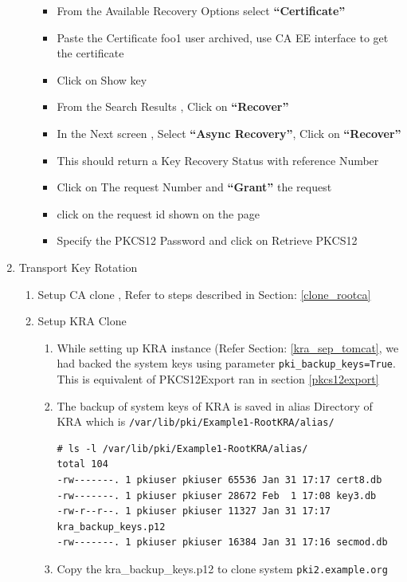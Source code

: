 \documentclass[12pt]{report}
\begin{document}
\begin{enumerate}[label*=\arabic*.]
\begin{enumerate}[label*=\arabic*.]
\begin{itemize}
                        \item From the Available Recovery Options select \textbf{``Certificate''}
                        \item Paste the Certificate foo1 user archived, use CA EE interface to get the certificate
                        \item Click on Show key 
                        \item From the Search Results , Click on \textbf{``Recover''}
                        \item In the Next screen , Select \textbf{``Async Recovery''}, Click on \textbf{``Recover''}
                        \item This should return a Key Recovery Status with reference Number
                        \item Click on The request Number and \textbf{``Grant''} the request
                        \item click on the request id shown on the page
                        \item Specify the PKCS12 Password and click on Retrieve PKCS12
                    \end{itemize}
            \end{enumerate}
        \item Transport Key Rotation
            \begin{enumerate}[label*=\arabic*.]
                \item Setup CA clone , Refer to steps described in Section: \ref{clone_rootca}
                \item Setup KRA Clone
                    \begin{enumerate}[label*=\arabic*.]
                        \item While setting up KRA instance (Refer Section: \ref{kra_sep_tomcat}, we had
                            backed the system keys using parameter \texttt{pki\_backup\_keys=True}. This 
                            is equivalent of PKCS12Export ran in section \ref{pkcs12export} 
                        \item The backup of system keys of KRA is saved in alias Directory of KRA which is
                            \texttt{/var/lib/pki/Example1-RootKRA/alias/}
                            \begin{lstlisting}[style=bashInputStyle]
# ls -l /var/lib/pki/Example1-RootKRA/alias/
total 104
-rw-------. 1 pkiuser pkiuser 65536 Jan 31 17:17 cert8.db
-rw-------. 1 pkiuser pkiuser 28672 Feb  1 17:08 key3.db
-rw-r--r--. 1 pkiuser pkiuser 11327 Jan 31 17:17 kra_backup_keys.p12
-rw-------. 1 pkiuser pkiuser 16384 Jan 31 17:16 secmod.db
                            \end{lstlisting}
                        \item Copy the kra\_backup\_keys.p12 to clone system \texttt{pki2.example.org}


\end{enumerate}
\end{enumerate}
\end{enumerate}
\end{document}
